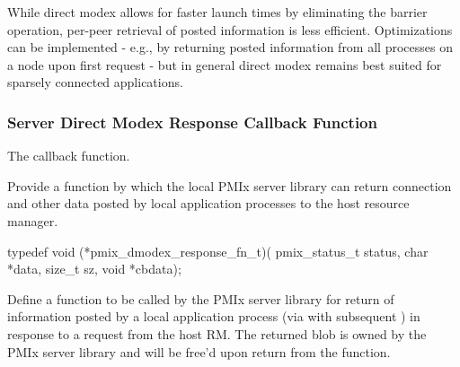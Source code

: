 \adviceuserstart
While direct modex allows for faster launch times by eliminating the barrier operation, per-peer retrieval of posted information is less efficient. Optimizations can be implemented - e.g., by returning posted information from all processes on a node upon first request - but in general direct modex remains best suited for sparsely connected applications.
\adviceuserend

\subsubsection{Server Direct Modex Response Callback Function}

The  callback function.

\summary

Provide a function by which the local \ac{PMIx} server library can return connection and other data posted by local application processes to the host resource manager.

\format

\cspecificstart
\begin{codepar}
typedef void (*pmix_dmodex_response_fn_t)(
                    pmix_status_t status,
                    char *data, size_t sz,
                    void *cbdata);
\end{codepar}
\cspecificend

\begin{arglist}
\end{arglist}

\descr
Define a function to be called by the PMIx server library for return of information posted by a local application process (via  with subsequent ) in response to a request from the host RM. The returned  blob is owned by the PMIx server library and will be free’d upon return from the function.


\subsection{}

